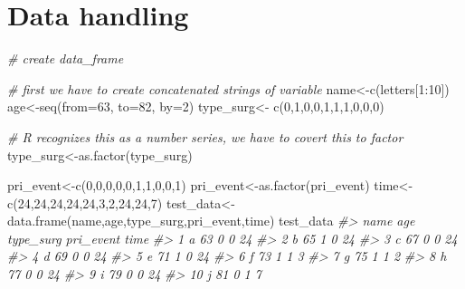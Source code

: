\documentclass[
]{article}
\newenvironment{Shaded}{\begin{snugshade}}{\end{snugshade}}
\newcommand{\AttributeTok}[1]{\textcolor[rgb]{0.77,0.63,0.00}{#1}}
\newcommand{\CommentTok}[1]{\textcolor[rgb]{0.56,0.35,0.01}{\textit{#1}}}
\newcommand{\DecValTok}[1]{\textcolor[rgb]{0.00,0.00,0.81}{#1}}
\newcommand{\FunctionTok}[1]{\textcolor[rgb]{0.00,0.00,0.00}{#1}}
\newcommand{\NormalTok}[1]{#1}
\newcommand{\OtherTok}[1]{\textcolor[rgb]{0.56,0.35,0.01}{#1}}
\newcommand{\SpecialCharTok}[1]{\textcolor[rgb]{0.00,0.00,0.00}{#1}}
\begin{document}
\hypertarget{data-handling}{%
\section{Data handling}\label{data-handling}}

\begin{Shaded}
\begin{Highlighting}[]
\CommentTok{\# create data\_frame}

\CommentTok{\# first we have to create concatenated strings of variable}
\NormalTok{name}\OtherTok{\textless{}{-}}\FunctionTok{c}\NormalTok{(letters[}\DecValTok{1}\SpecialCharTok{:}\DecValTok{10}\NormalTok{])}
\NormalTok{age}\OtherTok{\textless{}{-}}\FunctionTok{seq}\NormalTok{(}\AttributeTok{from=}\DecValTok{63}\NormalTok{, }\AttributeTok{to=}\DecValTok{82}\NormalTok{, }\AttributeTok{by=}\DecValTok{2}\NormalTok{)}
\NormalTok{type\_surg}\OtherTok{\textless{}{-}} \FunctionTok{c}\NormalTok{(}\DecValTok{0}\NormalTok{,}\DecValTok{1}\NormalTok{,}\DecValTok{0}\NormalTok{,}\DecValTok{0}\NormalTok{,}\DecValTok{1}\NormalTok{,}\DecValTok{1}\NormalTok{,}\DecValTok{1}\NormalTok{,}\DecValTok{0}\NormalTok{,}\DecValTok{0}\NormalTok{,}\DecValTok{0}\NormalTok{)}

\CommentTok{\# R recognizes this as a number series, we have to covert this to factor}
\NormalTok{type\_surg}\OtherTok{\textless{}{-}}\FunctionTok{as.factor}\NormalTok{(type\_surg)}

\NormalTok{pri\_event}\OtherTok{\textless{}{-}}\FunctionTok{c}\NormalTok{(}\DecValTok{0}\NormalTok{,}\DecValTok{0}\NormalTok{,}\DecValTok{0}\NormalTok{,}\DecValTok{0}\NormalTok{,}\DecValTok{0}\NormalTok{,}\DecValTok{1}\NormalTok{,}\DecValTok{1}\NormalTok{,}\DecValTok{0}\NormalTok{,}\DecValTok{0}\NormalTok{,}\DecValTok{1}\NormalTok{)}
\NormalTok{pri\_event}\OtherTok{\textless{}{-}}\FunctionTok{as.factor}\NormalTok{(pri\_event)}
\NormalTok{time}\OtherTok{\textless{}{-}}\FunctionTok{c}\NormalTok{(}\DecValTok{24}\NormalTok{,}\DecValTok{24}\NormalTok{,}\DecValTok{24}\NormalTok{,}\DecValTok{24}\NormalTok{,}\DecValTok{24}\NormalTok{,}\DecValTok{3}\NormalTok{,}\DecValTok{2}\NormalTok{,}\DecValTok{24}\NormalTok{,}\DecValTok{24}\NormalTok{,}\DecValTok{7}\NormalTok{)}
\NormalTok{test\_data}\OtherTok{\textless{}{-}} \FunctionTok{data.frame}\NormalTok{(name,age,type\_surg,pri\_event,time)}
\NormalTok{test\_data}
\CommentTok{\#\textgreater{}    name age type\_surg pri\_event time}
\CommentTok{\#\textgreater{} 1     a  63         0         0   24}
\CommentTok{\#\textgreater{} 2     b  65         1         0   24}
\CommentTok{\#\textgreater{} 3     c  67         0         0   24}
\CommentTok{\#\textgreater{} 4     d  69         0         0   24}
\CommentTok{\#\textgreater{} 5     e  71         1         0   24}
\CommentTok{\#\textgreater{} 6     f  73         1         1    3}
\CommentTok{\#\textgreater{} 7     g  75         1         1    2}
\CommentTok{\#\textgreater{} 8     h  77         0         0   24}
\CommentTok{\#\textgreater{} 9     i  79         0         0   24}
\CommentTok{\#\textgreater{} 10    j  81         0         1    7}


\end{Highlighting}
\end{Shaded}
\end{document}
